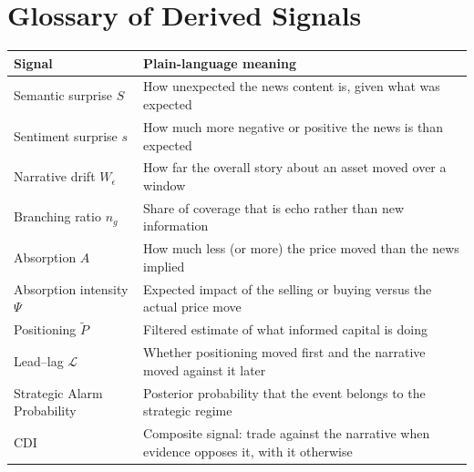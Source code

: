 \documentclass[11pt,a4paper]{article}
\theoremstyle{plain}
\theoremstyle{definition}
\theoremstyle{remark}
\begin{document}
\section{Glossary of Derived Signals}\label{app:glossary}
\begin{table}[ht]
\centering
\small
\begin{tabularx}{\textwidth}{@{}lX@{}}
\toprule
Signal & Plain-language meaning \\
\midrule
Semantic surprise $S$ & How unexpected the news content is, given what was expected \\
Sentiment surprise $s$ & How much more negative or positive the news is than expected \\
Narrative drift $W_\epsilon$ & How far the overall story about an asset moved over a window \\
Branching ratio $n_g$ & Share of coverage that is echo rather than new information \\
Absorption $A$ & How much less (or more) the price moved than the news implied \\
Absorption intensity $\Psi$ & Expected impact of the selling or buying versus the actual price move \\
Positioning $\tilde P$ & Filtered estimate of what informed capital is doing \\
Lead--lag $\mathcal{L}$ & Whether positioning moved first and the narrative moved against it later \\
Strategic Alarm Probability & Posterior probability that the event belongs to the strategic regime \\
CDI & Composite signal: trade against the narrative when evidence opposes it, with it otherwise \\
\bottomrule
\end{tabularx}
\end{table}
\end{document}
